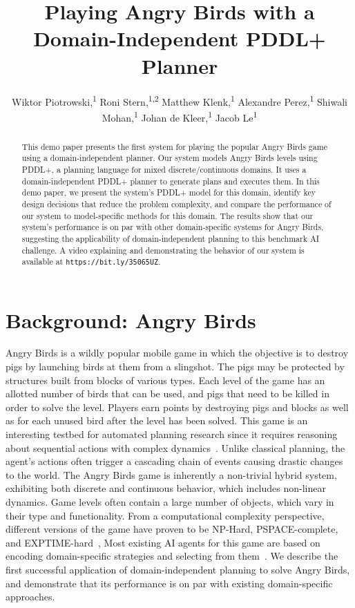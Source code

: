 \documentclass[letterpaper]{article}
\title{Playing Angry Birds with a Domain-Independent PDDL+ Planner}
\author{
Wiktor Piotrowski,\textsuperscript{\rm 1}
Roni Stern,\textsuperscript{\rm 1,2}
Matthew Klenk,\textsuperscript{\rm 1}
Alexandre Perez,\textsuperscript{\rm 1}
Shiwali Mohan,\textsuperscript{\rm 1}
Johan de Kleer,\textsuperscript{\rm 1}
Jacob Le\textsuperscript{\rm 1}
\\
}
\begin{document}
\maketitle

\begin{abstract}
This demo paper presents the first system for playing  the popular Angry Birds game using a domain-independent planner.
Our system models Angry Birds levels using PDDL+, a planning language for mixed discrete/continuous domains. It uses a domain-independent PDDL+ planner to generate plans and executes them.
In this demo paper, we present the system's PDDL+ model for this domain, identify key design decisions that reduce the problem complexity, and compare the performance of our system to model-specific methods for this domain. The results show that our system's performance is on par with other domain-specific systems for Angry Birds, suggesting the applicability of domain-independent planning to this benchmark AI challenge.
A video explaining and demonstrating the behavior of our system is available at \texttt{https://bit.ly/35065UZ}.
\end{abstract}




\section{Background: Angry Birds}
Angry Birds is a wildly popular mobile game in which the objective is to destroy pigs by launching birds at them from a slingshot. The pigs may be protected by structures built from blocks of various types. Each level of the game has an allotted number of birds that can be used, and pigs that need to be killed in order to solve the level.
Players earn points by destroying pigs and blocks as well as for each unused bird after the level has been solved.
This game is an interesting testbed for automated planning research since it
requires reasoning about sequential actions with complex dynamics~\cite{renz2019ai}.
Unlike classical planning, the agent's actions often trigger a cascading chain of events causing drastic changes to the world.
The Angry Birds game is inherently a non-trivial hybrid system, exhibiting both discrete and continuous behavior, which includes non-linear dynamics.
Game levels often contain a large number of objects, which vary in their type and functionality.
From a computational complexity perspective, different versions of the game have proven to be NP-Hard, PSPACE-complete, and EXPTIME-hard~\cite{stephenson2020computational},
Most existing AI agents for this game are based on encoding domain-specific strategies and selecting from them~\cite{borovicka2014datalab,wang2017description}.
We describe the first successful application of domain-independent planning to solve Angry Birds,
and demonstrate that its performance is on par with existing domain-specific approaches.
\end{document}
